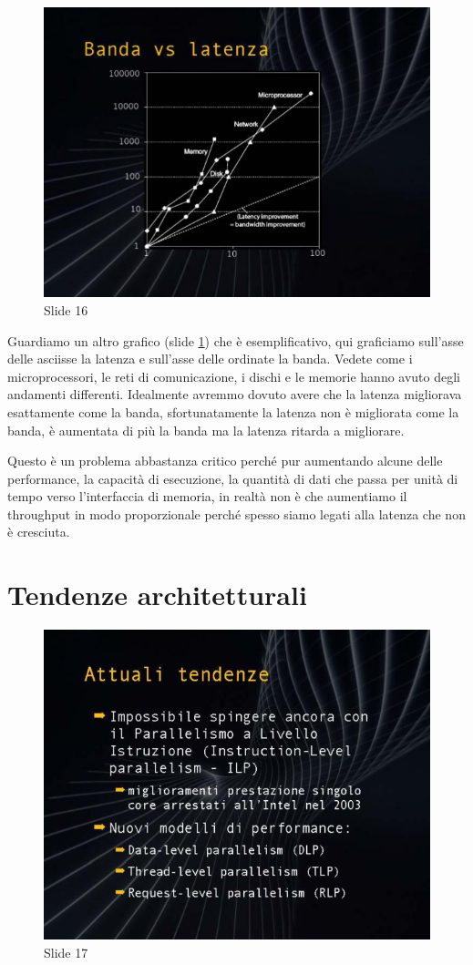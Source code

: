 \begin{figure}[ht]
    \centering
    \includegraphics[width=0.8\linewidth]{images/Lez01_p03_fig_04.png}
    \caption{Slide 16}
    \label{fig:slide_16}
\end{figure}

Guardiamo un altro grafico (slide \ref{fig:slide_16}) che è esemplificativo, qui graficiamo sull'asse delle asciisse la latenza e sull'asse delle ordinate la banda.
Vedete come i microprocessori, le reti di comunicazione, i dischi e le memorie hanno avuto degli andamenti differenti.
Idealmente avremmo dovuto avere che la latenza migliorava esattamente come la banda, sfortunatamente la latenza non è migliorata come la banda, è aumentata di più la banda ma la latenza ritarda a migliorare.

Questo è un problema abbastanza critico perché pur aumentando alcune delle performance, la capacità di esecuzione, la quantità di dati che passa per unità di tempo verso l'interfaccia di memoria, in realtà non è che aumentiamo il throughput in modo proporzionale perché spesso siamo legati alla latenza che non è cresciuta.

\section{Tendenze architetturali}

\begin{figure}[ht]
    \centering
    \includegraphics[width=0.8\linewidth]{images/Lez01_p03_fig_05.png}
    \caption{Slide 17}
    \label{fig:slide_17}
\end{figure}

